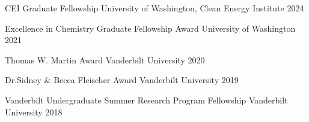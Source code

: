 



\begin{cvhonors}


\cvhonor
{CEI Graduate Fellowship}%
{University of Washington, Clean Energy Institute} %
{} %
{2024} %


\cvhonor
{Excellence in Chemistry Graduate Fellowship Award}%
{University of Washington} %
{} %
{2021} %


\cvhonor
{Thomas W. Martin Award} %
{Vanderbilt University}%
{} %
{2020} %


\cvhonor
{Dr.Sidney \& Becca Fleischer Award}%
{Vanderbilt University} %
{} %
{2019} %


\cvhonor
{Vanderbilt Undergraduate Summer Research Program Fellowship} %
{Vanderbilt University} %
{} %
{2018} %


\end{cvhonors}
\vspace{-1cm}
